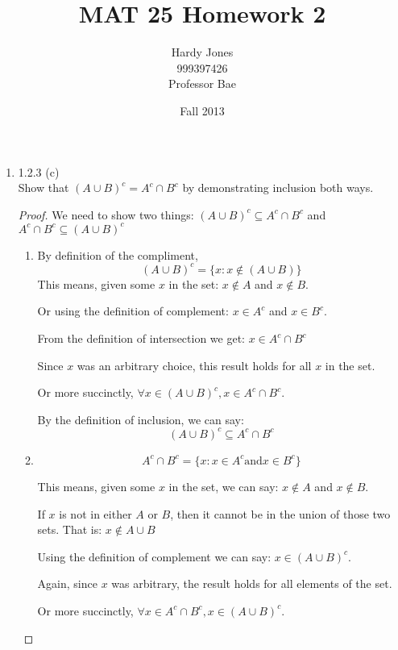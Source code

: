 \documentclass[12pt,letterpaper]{article}
\title{MAT 25 Homework 2\vspace{-2ex}}
\author{Hardy Jones\\
        999397426\\
        Professor Bae\vspace{-2ex}}
\date{Fall 2013}
\begin{document}
  \maketitle

  \begin{enumerate}
    \item 1.2.3 (c) \\
      Show that $(A \cup B)^c = A^c \cap B^c$
      by demonstrating inclusion both ways.

      \begin{proof}
        We need to show  two things:
        $(A \cup B)^c \subseteq A^c \cap B^c$
        and
        $A^c \cap B^c \subseteq (A \cup B)^c$

        \begin{enumerate}
          \item
            By definition of the compliment,
            \[(A \cup B)^c = \{x : x \notin (A \cup B)\}\]
            This means, given some $x$ in the set:
            $x \notin A$ and $x \notin B$.

            Or using the definition of complement:
            $x \in A^c$ and $x \in B^c$.

            From the definition of intersection we get:
            $x \in A^c \cap B^c$

            Since $x$ was an arbitrary choice,
            this result holds for all $x$ in the set.

            Or more succinctly,
            $\forall x \in (A \cup B)^c, x \in A^c \cap B^c$.

            By the definition of inclusion, we can say:
            \[(A \cup B)^c \subseteq A^c \cap B^c\]

          \item
            \[A^c \cap B^c = \{x : x \in A^c \text{and} x \in B^c\}\]

            This means, given some $x$ in the set, we can say:
            $x \notin A$ and $x \notin B$.

            If $x$ is not in either $A$ or $B$,
            then it cannot be in the union of those two sets.
            That is: $x \notin A \cup B$

            Using the definition of complement we can say:
            $x \in (A \cup B)^c$.

            Again, since $x$ was arbitrary,
            the result holds for all elements of the set.

            Or more succinctly,
            $\forall x \in A^c \cap B^c, x \in (A \cup B)^c$.


\end{enumerate}
\end{proof}
\end{enumerate}
\end{document}
